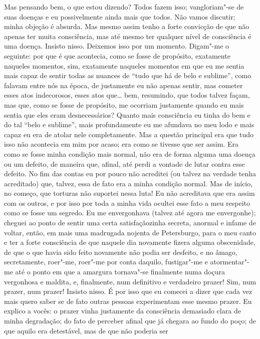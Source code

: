 Mas pensando bem, o que estou dizendo? Todos fazem isso; vangloriam"-se
de suas doenças e eu possivelmente ainda mais que todos. Não vamos
discutir; minha objeção é absurda. Mas mesmo assim tenho a forte
convicção de que não apenas ter muita consciência, mas até mesmo ter
qualquer nível de consciência é uma doença. Insisto nisso. Deixemos
isso por um momento. Digam"-me o seguinte: por que é que acontecia, como
se fosse de propósito, exatamente naqueles momentos, sim, exatamente
naqueles momentos em que eu me sentia mais capaz de sentir todas as
nuances de “tudo que há de belo e sublime”, como falavam entre nós na
época, de justamente eu não apenas sentir, mas cometer esses atos
indecorosos, esses atos que\ldots{} bem, resumindo, que todos talvez façam,
mas que, como se fosse de propósito, me ocorriam justamente quando eu
mais sentia que eles eram desnecessários? Quanto mais consciência eu
tinha do bem e do tal “belo e sublime”, mais profundamente eu me
afundava no meu lodo e mais capaz eu era de atolar nele completamente.
Mas a questão principal era que tudo isso não acontecia em mim por
acaso; era como se tivesse que ser assim. Era como se fosse minha
condição mais normal, não era de forma alguma uma doença ou um defeito,
de maneira que, afinal, até perdi a vontade de lutar contra esse
defeito. No fim das contas eu por pouco não acreditei (ou talvez na
verdade tenha acreditado) que, talvez, essa de fato era a minha
condição normal. Mas de início, no começo, que torturas não suportei
nessa luta! Eu não acreditava que era assim com os outros, e por isso
por toda a minha vida ocultei esse fato a meu respeito como se fosse um
segredo. Eu me envergonhava (talvez até agora me envergonhe); cheguei
ao ponto de sentir uma certa satisfaçãozinha secreta, anormal e infame
de voltar, então, em mais uma madrugada nojenta de Petersburgo, para o
meu canto e ter a forte consciência de que naquele dia novamente fizera
alguma obscenidade, de que o que havia sido feito novamente não podia
ser desfeito, e no âmago, secretamente, roer"-me, roer"-me por conta
daquilo, fustigar"-me e atormentar"-me até o ponto em que a amargura
tornava"-se finalmente numa doçura vergonhosa e maldita, e, finalmente,
num definitivo e verdadeiro prazer! Sim, num prazer, num prazer!
Insisto nisso. É por isso que eu comecei a dizer que cada vez mais
quero saber se de fato outras pessoas experimentam esse mesmo prazer.
Eu explico a vocês: o prazer vinha justamente da consciência demasiado
clara de minha degradação; do fato de perceber afinal que já chegara ao
fundo do poço; de que aquilo era detestável, mas de que não poderia ser
